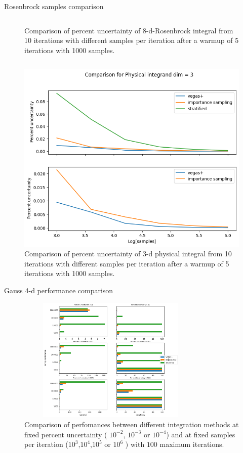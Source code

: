 \documentclass[t,handout,professionalfonts]{beamer}
\begin{document}
\begin{frame}{Rosenbrock samples comparison}
\begin{columns}[T]
\begin{column}{0.5 \textwidth}
\begin{figure}
				\caption{Comparison of  percent uncertainty of  8-d-Rosenbrock integral from 10 iterations with different samples per iteration after a warmup of 5 iterations with 1000 samples.}
			\end{figure}
		\end{column}
	\end{columns}
	
\end{frame}

\begin{frame}
	\tiny
	\begin{figure}
		\includegraphics[width=height=4cm,width=6cm]{../plots/dy_aa_samples_log.png}
		\caption{Comparison of  percent uncertainty of  3-d physical integral from 10 iterations with different samples per iteration after a warmup of 5 iterations with 1000 samples.}
	\end{figure}
	
\end{frame}

\begin{frame}{Gauss 4-d performance comparison}
	\tiny
	\vspace{-0.4cm}
	\begin{figure}
		\includegraphics[height=6cm,width=9cm]{../performance_plots/gauss4-d.png}
		\caption{Comparison of perfomances between different integration methods at fixed percent uncertainty ( $10^{-2}$, $10^{-3}$ or $10^{-4}$) and at fixed samples per iteration ($10^3$,$10^4$,$10^5$ or $10^6$ ) with $100$ maximum iterations.}
	\end{figure}
	
\end{frame}
\end{document}
